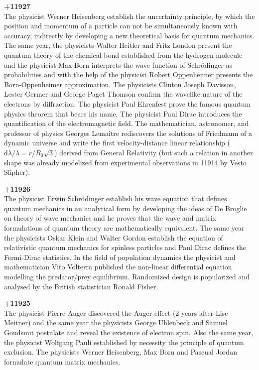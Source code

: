 \textbf{+11927}\\
The physicist Werner Heisenberg establish the uncertainty principle, by which the position and momentum of a particle can not be simultaneously known with accuracy, indirectly by developing a new theoretical basis for quantum mechanics. The same year, the physicists Walter Heitler and Fritz London present the quantum theory of the chemical bond established from the hydrogen molecule and the physicist Max Born interprets the wave function of Schrödinger as probabilities and with the help of the physicist Robert Oppenheimer presents the Born-Oppenheimer approximation. The physicists Clinton Joseph Davisson, Lester Germer and George Paget Thomson confirm the wavelike nature of the electrons by diffraction. The physicist Paul Ehrenfest prove the famous quantum physics theorem that bears his name. The physicist Paul Dirac introduces the quantification of the electromagnetic field. The mathematician, astronomer, and professor of physics Georges Lemaître rediscovers the solutions of Friedmann of a dynamic universe and write the first velocity-distance linear relationship ($\mathrm{d}\lambda/\lambda =r/R_0\sqrt{3}$) derived from General Relativity (but such a relation in another shape was already modelized from experimental observations in 11914 by Vesto Slipher).

\textbf{+11926}\\
The physicist Erwin Schrödinger establish his wave equation that defines quantum mechanics in an analytical form by developing the ideas of De Broglie on theory of wave mechanics and he proves that the wave and matrix formulations of quantum theory are mathematically equivalent. The same year the physicists Oskar Klein and Walter Gordon establish the equation of relativistic quantum mechanics for spinless particles and Paul Dirac defines the Fermi-Dirac statistics. In the field of population dynamics the physicist and mathematician Vito Volterra published the non-linear differential equation modelling the predator/prey equilibrium. Randomized design is popularized and analysed by the British statistician Ronald Fisher.

\textbf{+11925}\\
The physicist Pierre Auger discovered the Auger effect (2 years after Lise Meitner) and the same year the physicists George Uhlenbeck and Samuel Goudsmit postulate and reveal the existence of electron spin. Also the same year, the physicist Wolfgang Pauli established by necessity the principle of quantum exclusion. The physicists Werner Heisenberg, Max Born and Pascual Jordan formulate quantum matrix mechanics.

